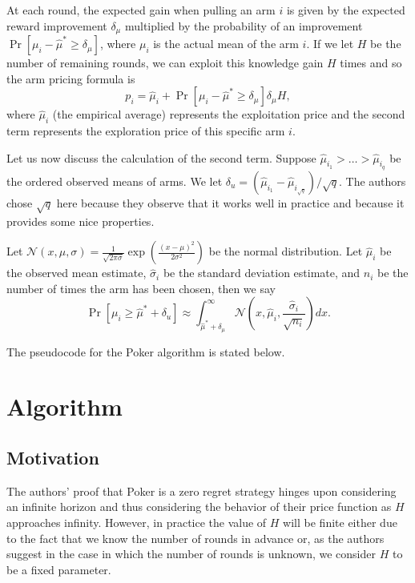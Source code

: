 \documentclass[12pt]{article}
\begin{document}
At each round, the expected gain when pulling an arm $i$ is given by the expected reward improvement $\delta_{\mu}$ multiplied by the probability of an
improvement $\Pr[\mu_i - \hat{\mu}^{*} \ge \delta_{\mu}]$, where $\mu_i$ is the actual mean of the arm $i$.  If we let $H$ be the number of remaining rounds, 
we can exploit this knowledge gain $H$ times and so the arm pricing formula is 
$$
p_i = \hat{\mu}_i + \Pr[\mu_i - \hat{\mu}^{*} \ge \delta_{\mu}] \delta_{\mu} H,
$$
where $\hat{\mu}_i$ (the empirical average) represents the exploitation price and the second term represents the exploration price of this specific arm $i$. 

Let us now discuss the calculation of the second term.  Suppose $\hat{\mu}_{i_1} > \ldots > \hat{\mu}_{i_q}$ be the ordered observed means of arms.  
We let $\delta_u = \left(\hat{\mu}_{i_1} - \hat{\mu}_{i_{\sqrt{q}}} \right)/\sqrt{q}$.  The authors chose $\sqrt{q}$ here because they observe that it works well
in practice and because it provides some nice properties.

Let $\mathcal{N}(x, \mu, \sigma) = \frac{1}{\sqrt{2 \pi \sigma}} \exp \left(\frac{(x - \mu)^2}{2 \sigma^2} \right)$ be the normal distribution.  
Let $\hat{\mu}_i$ be the observed mean estimate, $\hat{\sigma}_i$ be the standard deviation estimate, and $n_i$ be the number of times the arm has been chosen, then
we say
$$
\Pr[\mu_i \ge \hat{\mu}^{*} + \delta_u] \approx \int_{\hat{\mu}^{*} + \delta_{\mu}}^{\infty} \mathcal{N}\left(x, \hat{\mu}_{i}, \frac{\hat{\sigma}_i}{\sqrt{n_i}} \right) dx.
$$

The pseudocode for the Poker algorithm is stated below.

\section{Algorithm}

\subsection{Motivation}

The authors' proof that Poker is a zero regret strategy hinges upon considering an infinite horizon and thus considering the behavior of their price function as $H$ approaches infinity. However, in practice the value of $H$ will be finite either due to the fact that we know the number of rounds in advance or, as the authors suggest in the case in which the number of rounds is unknown, we consider $H$ to be a fixed parameter.
\end{document}
